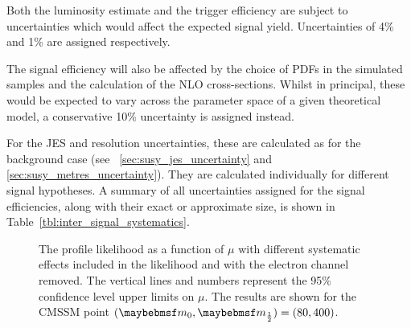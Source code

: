 Both the luminosity estimate and the trigger efficiency are subject to
uncertainties which would affect the expected signal yield. Uncertainties of 4\%
and 1\% are assigned respectively.

The signal efficiency will also be affected by the choice of \acp{PDF} in the
simulated samples and the calculation of the \ac{NLO} cross-sections. Whilst in
principal, these would be expected to vary across the parameter space of a given
theoretical model, a conservative 10\% uncertainty is assigned instead.

For the \ac{JES} and \MET resolution uncertainties, these are calculated as for
the background case (see \secs~\ref{sec:susy_jes_uncertainty} and
\ref{sec:susy_metres_uncertainty}). They are calculated individually for
different signal hypotheses. A summary of all uncertainties assigned for the
signal efficiencies, along with their exact or approximate size, is shown in
Table~\ref{tbl:inter_signal_systematics}.



\begin{figure}
\centering
{}\quad
{}
\caption[The profile likelihood as a function of $\mu$]{The profile
  likelihood as a function of $\mu$ 
  with different systematic effects included in the likelihood and
   with the electron channel
  removed. The vertical lines and numbers represent the 95\%
  confidence level upper limits on $\mu$. The results are shown for the
  \ac{CMSSM} point $(\Mzero, \Mhalf) = (80, 400)$. }
\label{fig:inter_pl}
\end{figure}

